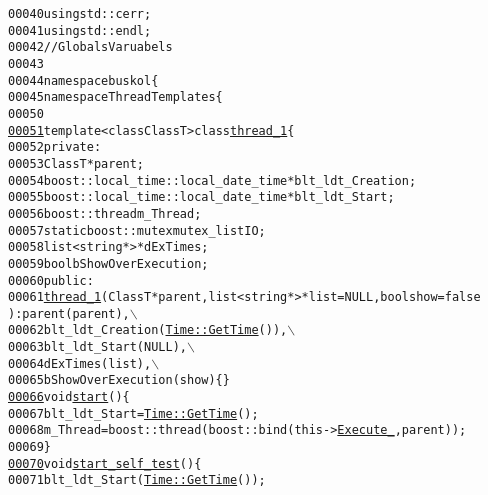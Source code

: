 \begin{footnotesize}
\begin{alltt}
00040 \textcolor{keyword}{using} std::cerr;
00041 \textcolor{keyword}{using} std::endl;
00042 \textcolor{comment}{//Globals Varuabels}
00043 
00044 \textcolor{keyword}{namespace }buskol\{
00045     \textcolor{keyword}{namespace }ThreadTemplates\{
00050 
\hypertarget{myThreadTemplates_8hpp_source_l00051}{}\hyperlink{classbuskol_1_1ThreadTemplates_1_1thread__1}{00051}     \textcolor{keyword}{template} <\textcolor{keyword}{class} ClassT> \textcolor{keyword}{class }\hyperlink{classbuskol_1_1ThreadTemplates_1_1thread__1}{thread_1}\{
00052         \textcolor{keyword}{private}:
00053             ClassT *parent; 
00054             boost::local\_time::local\_date\_time *blt\_ldt\_Creation; 
00055             boost::local\_time::local\_date\_time *blt\_ldt\_Start; 
00056             boost::thread m\_Thread; 
00057             \textcolor{keyword}{static} boost::mutex mutex\_listIO; 
00058             list<string*> *dExTimes; 
00059             \textcolor{keywordtype}{bool} bShowOverExecution; 
00060         \textcolor{keyword}{public}:
00061             \hyperlink{classbuskol_1_1ThreadTemplates_1_1thread__1}{thread_1}(ClassT *parent, list<string*> *list = NULL,\textcolor{keywordtype}{bool} show = \textcolor{keyword}{false
      }): parent(parent),\(\backslash\)
00062                 blt\_ldt\_Creation(\hyperlink{group__libbuskol_ga6302b620351164dda28cc6d9d1b81aa5}{Time::GetTime}()),\(\backslash\)
00063                 blt\_ldt\_Start(NULL),\(\backslash\)
00064                 dExTimes(list),\(\backslash\)
00065                 bShowOverExecution(show)\{\}
\hypertarget{myThreadTemplates_8hpp_source_l00066}{}\hyperlink{classbuskol_1_1ThreadTemplates_1_1thread__1_a71250f676aa96d06d5b693b685af7555}{00066}             \textcolor{keywordtype}{void} \hyperlink{classbuskol_1_1ThreadTemplates_1_1thread__1_a71250f676aa96d06d5b693b685af7555}{start}()\{
00067                 blt\_ldt\_Start = \hyperlink{group__libbuskol_ga6302b620351164dda28cc6d9d1b81aa5}{Time::GetTime}();
00068                 m\_Thread = boost::thread (boost::bind(this->\hyperlink{classbuskol_1_1ThreadTemplates_1_1thread__1_a37cde0d5c6105d9194ce1cf981cf9c5a}{Execute_},parent));
00069             \}
\hypertarget{myThreadTemplates_8hpp_source_l00070}{}\hyperlink{classbuskol_1_1ThreadTemplates_1_1thread__1_ad3a839cb3ec07abf8cf54fe81fd5e7f3}{00070}             \textcolor{keywordtype}{void} \hyperlink{classbuskol_1_1ThreadTemplates_1_1thread__1_ad3a839cb3ec07abf8cf54fe81fd5e7f3}{start_self_test}()\{
00071                 blt\_ldt\_Start(\hyperlink{group__libbuskol_ga6302b620351164dda28cc6d9d1b81aa5}{Time::GetTime}());

\end{alltt}
\end{footnotesize}
